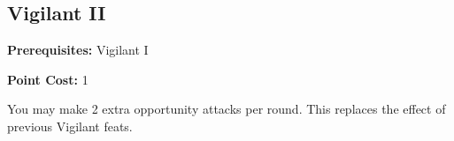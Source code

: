 \subsection*{Vigilant II}\label{feat:vigilant2}

\noindent
\textbf{Prerequisites:} Vigilant I

\noindent
\textbf{Point Cost:} 1

You may make 2 extra opportunity attacks per round. This replaces the effect
of previous Vigilant feats.
